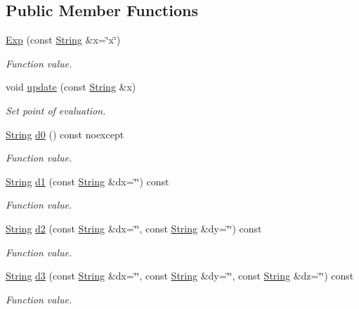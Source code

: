 \subsection*{Public Member Functions}
\begin{DoxyCompactItemize}
\item 
\hyperlink{structFunG_1_1stringify_1_1Exp_aa34c58712a70a9c721485e08707a9325}{Exp} (const \hyperlink{structFunG_1_1String}{String} \&x=\char`\"{}x\char`\"{})
\begin{DoxyCompactList}\small\item\em Function value. \end{DoxyCompactList}\item 
void \hyperlink{structFunG_1_1stringify_1_1Exp_a218d7c133785256fa46f847bc26fd225}{update} (const \hyperlink{structFunG_1_1String}{String} \&x)
\begin{DoxyCompactList}\small\item\em Set point of evaluation. \end{DoxyCompactList}\item 
\hyperlink{structFunG_1_1String}{String} \hyperlink{structFunG_1_1stringify_1_1Exp_a3f0092309ddca720d3bbd1971ffcf07c}{d0} () const noexcept
\begin{DoxyCompactList}\small\item\em Function value. \end{DoxyCompactList}\item 
\hyperlink{structFunG_1_1String}{String} \hyperlink{structFunG_1_1stringify_1_1Exp_ab5ee4cebb0dd2c98722730701d1b1a9f}{d1} (const \hyperlink{structFunG_1_1String}{String} \&dx=\char`\"{}\char`\"{}) const 
\begin{DoxyCompactList}\small\item\em Function value. \end{DoxyCompactList}\item 
\hyperlink{structFunG_1_1String}{String} \hyperlink{structFunG_1_1stringify_1_1Exp_a17fe1ef0d5dca207c7ec94363727c105}{d2} (const \hyperlink{structFunG_1_1String}{String} \&dx=\char`\"{}\char`\"{}, const \hyperlink{structFunG_1_1String}{String} \&dy=\char`\"{}\char`\"{}) const 
\begin{DoxyCompactList}\small\item\em Function value. \end{DoxyCompactList}\item 
\hyperlink{structFunG_1_1String}{String} \hyperlink{structFunG_1_1stringify_1_1Exp_a21dece8aa484405eb5965a71caf9aef8}{d3} (const \hyperlink{structFunG_1_1String}{String} \&dx=\char`\"{}\char`\"{}, const \hyperlink{structFunG_1_1String}{String} \&dy=\char`\"{}\char`\"{}, const \hyperlink{structFunG_1_1String}{String} \&dz=\char`\"{}\char`\"{}) const 
\begin{DoxyCompactList}\small\item\em Function value. \end{DoxyCompactList}\end{DoxyCompactItemize}


